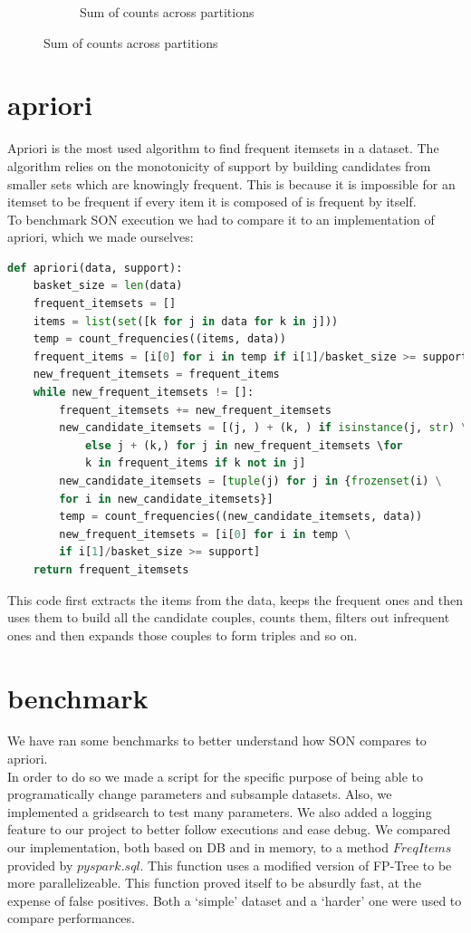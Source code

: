 \documentclass[a4paper]{article}
\begin{document}
\begin{figure}[h]
\begin{subfigure}[b]{0.3\textwidth}
         	\caption{Sum of counts across partitions}
         	\label{fig:totals}
		\end{subfigure}
	\end{figure}
	
	\newpage
	
	\section{apriori}
	\label{section:apriori}
	
	Apriori is the most used algorithm to find frequent itemsets in a dataset. The algorithm relies on the monotonicity of support by building candidates from smaller sets which are knowingly frequent. This is because it is impossible for an itemset to be frequent if every item it is composed of is frequent by itself.\\
	
	To benchmark SON execution we had to compare it to an implementation of apriori, which we made ourselves:
	\begin{lstlisting}[language=Python]
def apriori(data, support):
    basket_size = len(data)
    frequent_itemsets = []
    items = list(set([k for j in data for k in j]))
    temp = count_frequencies((items, data))
    frequent_items = [i[0] for i in temp if i[1]/basket_size >= support]
    new_frequent_itemsets = frequent_items
    while new_frequent_itemsets != []:
        frequent_itemsets += new_frequent_itemsets
        new_candidate_itemsets = [(j, ) + (k, ) if isinstance(j, str) \
        	else j + (k,) for j in new_frequent_itemsets \for
        	k in frequent_items if k not in j]
        new_candidate_itemsets = [tuple(j) for j in {frozenset(i) \
        for i in new_candidate_itemsets}]
        temp = count_frequencies((new_candidate_itemsets, data))
        new_frequent_itemsets = [i[0] for i in temp \
        if i[1]/basket_size >= support]
    return frequent_itemsets	
    \end{lstlisting}
    This code first extracts the items from the data, keeps the frequent ones and then uses them to build all the candidate couples, counts them, filters out infrequent ones and then expands those couples to form triples and so on.
	
	\section{benchmark}
	We have ran some benchmarks to better understand how SON compares to apriori.\\
	In order to do so we made a script for the specific purpose of being able to programatically change parameters and 
	subsample datasets.
	Also, we implemented a gridsearch to test many parameters. We also added a logging feature to our project to better follow executions and ease debug.
	We compared our implementation, both based on DB and in memory, to a method $FreqItems$ provided by $pyspark.sql$. 
	This function uses a modified version of FP-Tree to be more parallelizeable. This function proved itself to be absurdly fast, at the expense of false positives.
	Both a  `simple' dataset and a `harder' one were used to compare performances.
\end{document}
